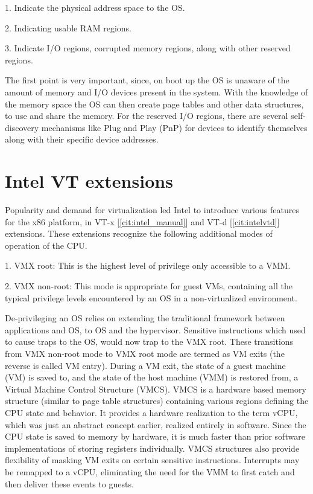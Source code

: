 1. Indicate the physical address space to the OS.

2. Indicating usable RAM regions.

3. Indicate I/O regions, corrupted memory regions, along with other reserved regions.

The first point is very important, since, on boot up the OS is unaware of the amount of memory and I/O devices present in the system. With the knowledge of the memory space the OS can then create page tables and other data structures, to use and share the memory. For the reserved I/O regions, there are several self-discovery mechanisms like Plug and Play (PnP) for devices to identify themselves along with their specific device addresses. 


\section{Intel VT extensions}


Popularity and demand for virtualization led Intel to introduce various features for the x86 platform, in VT-x [\ref{cit:intel_manual}] and VT-d [\ref{cit:intelvtd}] extensions. These extensions recognize the following additional modes of operation of the CPU.

1. VMX root: This is the highest level of privilege only accessible to a VMM.

2. VMX non-root: This mode is appropriate for guest VMs, containing all the typical privilege levels encountered by an OS in a non-virtualized environment.

De-privileging an OS relies on extending the traditional framework between applications and OS, to OS and the hypervisor. Sensitive instructions which used to cause traps to the OS, would now trap to the VMX root. These transitions from VMX non-root mode to VMX root mode are termed as VM exits (the reverse is called VM entry). During a VM exit, the state of a guest machine (VM) is saved to, and the state of the host machine (VMM) is restored from, a Virtual Machine Control Structure (VMCS). VMCS is a hardware based memory structure (similar to page table structures) containing various regions defining the CPU state and behavior. It provides a hardware realization to the term vCPU, which was just an abstract concept earlier, realized entirely in software. Since the CPU state is saved to memory by hardware, it is much faster than prior software implementations of storing registers individually. VMCS structures also provide flexibility of masking VM exits on certain sensitive instructions. Interrupts may be remapped to a vCPU, eliminating the need for the VMM to first catch and then deliver these events to guests.

